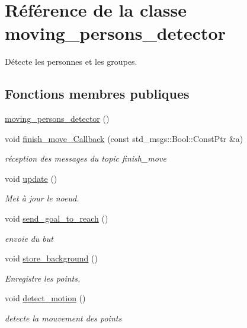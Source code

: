 \hypertarget{classmoving__persons__detector}{}\section{Référence de la classe moving\+\_\+persons\+\_\+detector}
\label{classmoving__persons__detector}


Détecte les personnes et les groupes.  


\subsection*{Fonctions membres publiques}
\begin{DoxyCompactItemize}
\item 
\hyperlink{classmoving__persons__detector_ab7d7bf4e0edf8a64a8a43e0a8dad3083}{moving\+\_\+persons\+\_\+detector} ()
\item 
void \hyperlink{classmoving__persons__detector_a7f3a34bf99f2070b44c3a2424a4a4559}{finish\+\_\+move\+\_\+\+Callback} (const std\+\_\+msgs\+::\+Bool\+::\+Const\+Ptr \&a)
\begin{DoxyCompactList}\small\item\em réception des messages du topic finish\+\_\+move \end{DoxyCompactList}\item 
void \hyperlink{classmoving__persons__detector_a83ca0ba4254abe369da899d54984502d}{update} ()
\begin{DoxyCompactList}\small\item\em Met à jour le noeud. \end{DoxyCompactList}\item 
void \hyperlink{classmoving__persons__detector_a8b1c0d12b9eca4cb94b195fbf5847726}{send\+\_\+goal\+\_\+to\+\_\+reach} ()
\begin{DoxyCompactList}\small\item\em envoie du but \end{DoxyCompactList}\item 
void \hyperlink{classmoving__persons__detector_a833595f068de84045e6d67ab68c474dd}{store\+\_\+background} ()
\begin{DoxyCompactList}\small\item\em Enregistre les points. \end{DoxyCompactList}\item 
void \hyperlink{classmoving__persons__detector_a5c0563104a7d043297d9db0a0fd1ad3f}{detect\+\_\+motion} ()
\begin{DoxyCompactList}\small\item\em detecte la mouvement des points \end{DoxyCompactList}\item 

\end{DoxyCompactItemize}
